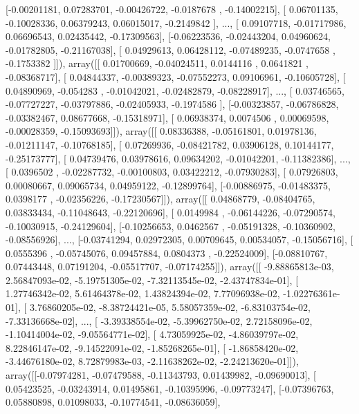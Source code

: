 \documentclass{article}
\begin{document}
       [-0.00201181,  0.07283701, -0.00426722, -0.0187678 , -0.14002215],
       [ 0.06701135, -0.10028336,  0.06379243,  0.06015017, -0.2149842 ],
       ..., 
       [ 0.09107718, -0.01717986,  0.06696543,  0.02435442, -0.17309563],
       [-0.06223536, -0.02443204,  0.04960624, -0.01782805, -0.21167038],
       [ 0.04929613,  0.06428112, -0.07489235, -0.0747658 , -0.1753382 ]]), array([[ 0.01700669, -0.04024511,  0.0144116 ,  0.0641821 , -0.08368717],
       [ 0.04844337, -0.00389323, -0.07552273,  0.09106961, -0.10605728],
       [ 0.04890969, -0.054283  , -0.01042021, -0.02482879, -0.08228917],
       ..., 
       [ 0.03746565, -0.07727227, -0.03797886, -0.02405933, -0.1974586 ],
       [-0.00323857, -0.06786828, -0.03382467,  0.08677668, -0.15318971],
       [ 0.06938374,  0.0074506 ,  0.00069598, -0.00028359, -0.15093693]]), array([[ 0.08336388, -0.05161801,  0.01978136, -0.01211147, -0.10768185],
       [ 0.07269936, -0.08421782,  0.03906128,  0.10144177, -0.25173777],
       [ 0.04739476,  0.03978616,  0.09634202, -0.01042201, -0.11382386],
       ..., 
       [ 0.0396502 , -0.02287732, -0.00100803,  0.03422212, -0.07930283],
       [ 0.07926803,  0.00080667,  0.09065734,  0.04959122, -0.12899764],
       [-0.00886975, -0.01483375,  0.0398177 , -0.02356226, -0.17230567]]), array([[ 0.04868779, -0.08404765,  0.03833434, -0.11048643, -0.22120696],
       [ 0.0149984 , -0.06144226, -0.07290574, -0.10030915, -0.24129604],
       [-0.10256653,  0.0462567 , -0.05191328, -0.10360902, -0.08556926],
       ..., 
       [-0.03741294,  0.02972305,  0.00709645,  0.00534057, -0.15056716],
       [ 0.0555396 , -0.05745076,  0.09457884,  0.0804373 , -0.22524009],
       [-0.08810767,  0.07443448,  0.07191204, -0.05517707, -0.07174255]]), array([[ -9.88865813e-03,   2.56847093e-02,  -5.19751305e-02,
         -7.32113545e-02,  -2.43747834e-01],
       [  1.27746342e-02,   5.61464378e-02,   1.43824394e-02,
          7.77096938e-02,  -1.02276361e-01],
       [  3.76860205e-02,  -8.38724421e-05,   5.58057359e-02,
         -6.83103754e-02,  -7.33136668e-02],
       ..., 
       [ -3.39338554e-02,  -5.39962750e-02,   2.72158096e-02,
         -1.10414004e-02,  -9.05564771e-02],
       [  4.73059925e-02,  -4.86039797e-02,   8.22846147e-02,
         -9.14522091e-02,  -1.85268265e-01],
       [ -1.86858420e-02,  -3.44676180e-02,   8.72879983e-03,
         -2.11638262e-02,  -2.24213620e-01]]), array([[-0.07974281, -0.07479588, -0.11343793,  0.01439982, -0.09690013],
       [ 0.05423525, -0.03243914,  0.01495861, -0.10395996, -0.09773247],
       [-0.07396763,  0.05880898,  0.01098033, -0.10774541, -0.08636059],
\end{document}
